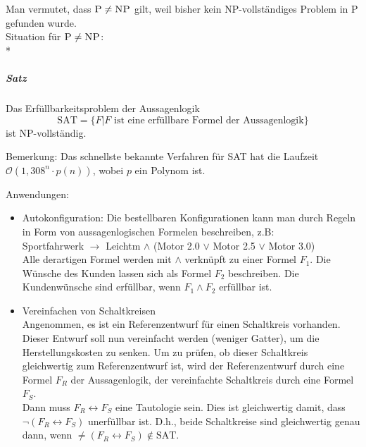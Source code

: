 \documentclass[a4paper]{scrartcl}
\begin{document}
Man vermutet, dass $\textsc{P} \neq \textsc{NP}$ gilt, weil bisher kein \textsc{NP}-vollständiges Problem in \textsc{P} gefunden wurde.\\
Situation für $\textsc{P} \neq \textsc{NP}$:\\*

\subparagraph{Satz} Das Erfüllbarkeitsproblem der Aussagenlogik
\[ \text{SAT} = \{ F | F \text{ ist eine erfüllbare Formel der Aussagenlogik} \}
\]
ist \textsc{NP}-vollständig.

Bemerkung: Das schnellste bekannte Verfahren für SAT hat die Laufzeit $\mathcal{O}(1,308^n \cdot p(n))$, wobei $p$ ein Polynom ist.

Anwendungen:
\begin{itemize}
\item Autokonfiguration: Die bestellbaren Konfigurationen kann man durch Regeln in Form von aussagenlogischen Formelen beschreiben, z.B:\\
Sportfahrwerk $\rightarrow$ Leichtm $\wedge$ (Motor 2.0 $\vee$ Motor 2.5 $\vee$ Motor 3.0)\\
Alle derartigen Formel werden mit $\wedge$ verknüpft zu einer Formel $F_1$. Die Wünsche des Kunden lassen sich als Formel $F_2$ beschreiben. Die Kundenwünsche sind erfüllbar, wenn $F_1 \wedge F_2$ erfüllbar ist.
\item Vereinfachen von Schaltkreisen\\
Angenommen, es ist ein Referenzentwurf für einen Schaltkreis vorhanden. Dieser Entwurf soll nun vereinfacht werden (weniger Gatter), um die Herstellungskosten zu senken. Um zu prüfen, ob dieser Schaltkreis gleichwertig zum Referenzentwurf ist, wird der Referenzentwurf durch eine Formel $F_R$ der Aussagenlogik, der vereinfachte Schaltkreis durch eine Formel $F_S$.\\
Dann muss $F_R \leftrightarrow F_S$ eine Tautologie sein. Dies ist gleichwertig damit, dass $\neg (F_R \leftrightarrow F_S)$ unerfüllbar ist. D.h., beide Schaltkreise sind gleichwertig genau dann, wenn $\neq (F_R \leftrightarrow F_S) \notin \text{SAT}$.
\end{itemize}
\end{document}

